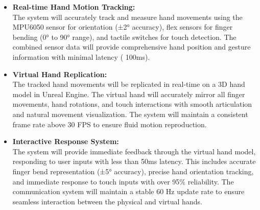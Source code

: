 

\begin{itemize}
    \item \textbf{Real-time Hand Motion Tracking:} \\
    The system will accurately track and measure hand movements using the MPU6050 sensor for orientation (±2° accuracy), flex sensors for finger bending (0° to 90° range), and tactile switches for touch detection. The combined sensor data will provide comprehensive hand position and gesture information with minimal latency (  100ms).

    \item \textbf{Virtual Hand Replication:} \\
    The tracked hand movements will be replicated in real-time on a 3D hand model in Unreal Engine. The virtual hand will accurately mirror all finger movements, hand rotations, and touch interactions with smooth articulation and natural movement visualization. The system will maintain a consistent frame rate above 30 FPS to ensure fluid motion reproduction.

    \item \textbf{Interactive Response System:} \\
    The system will provide immediate feedback through the virtual hand model, responding to user inputs with less than 50ms latency. This includes accurate finger bend representation (±5° accuracy), precise hand orientation tracking, and immediate response to touch inputs with over 95\% reliability. The communication system will maintain a stable 60 Hz update rate to ensure seamless interaction between the physical and virtual hands.
\end{itemize}
